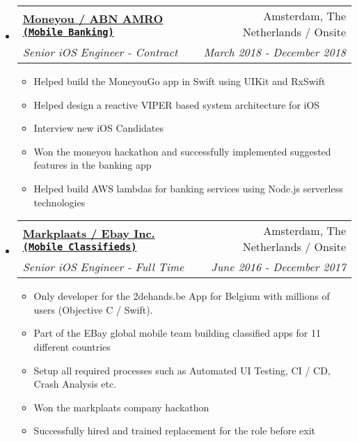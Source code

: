 \documentclass[letterpaper,11pt]{article}
\makeatletter
\newcommand{\resitem}[1]{\item #1 \vspace{-2pt}}
\newcommand{\ressubheading}[4]{
\begin{tabular*}{7.0in}{l@{\extracolsep{\fill}}r}
    \textbf{#1} & #2 \\
    \textit{#3} & \textit{#4} \\
\end{tabular*}\vspace{-6pt}}
\makeatother
\begin{document}
\begin{itemize}
    
\item
    \ressubheading{\href{https://www.moneyou.nl/}{Moneyou / ABN AMRO \texttt{(Mobile Banking)}}}{Amsterdam, The Netherlands / Onsite}{Senior iOS Engineer - Contract}{March 2018 - December 2018}
    \begin{itemize}
        \resitem{Helped build the MoneyouGo app in Swift using UIKit and RxSwift}
        \resitem{Helped design a reactive VIPER based system architecture for iOS}
        \resitem{Interview new iOS Candidates}
        \resitem{Won the moneyou hackathon and successfully implemented suggested features in the banking app}
        \resitem{Helped build AWS lambdas for banking services using Node.js serverless technologies}
    \end{itemize}

\vspace{0.4in}
    
\item
    \ressubheading{\href{https://www.markplaats.nl/}{Markplaats / Ebay Inc. \texttt{(Mobile Classifieds)}}}{Amsterdam, The Netherlands / Onsite}{Senior iOS Engineer - Full Time}{June 2016 - December 2017}
    \begin{itemize}
        \resitem{Only developer for the 2dehands.be App for Belgium with millions of users (Objective C / Swift).}
        \resitem{Part of the EBay global mobile team building classified apps for 11 different countries}
        \resitem{Setup all required processes such as Automated UI Testing, CI / CD, Crash Analysis etc.}
        \resitem{Won the markplaats company hackathon}
        \resitem{Successfully hired and trained replacement for the role before exit}
    \end{itemize}


\end{itemize}

\vspace{0.3in}
\end{document}
